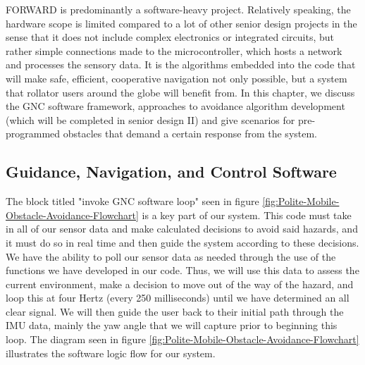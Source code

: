 \noindent FORWARD is predominantly a software-heavy project. Relatively speaking, the hardware scope is limited compared to a lot of other senior design projects in the sense that it does not include complex electronics or integrated circuits, but rather simple connections made to the microcontroller, which hosts a network and processes the sensory data. It is the algorithms embedded into the code that will make safe, efficient, cooperative navigation not only possible, but a system that rollator users around the globe will benefit from. In this chapter, we discuss the GNC software framework, approaches to avoidance algorithm development (which will be completed in senior design II) and give scenarios for pre-programmed obstacles that demand a certain response from the system.

\begin{center}
\end{center}

\subsection{Guidance, Navigation, and Control Software} \label{GNC_Software}
\noindent The block titled "invoke GNC software loop" seen in figure \ref{fig:Polite-Mobile-Obstacle-Avoidance-Flowchart} is a key part of our system. This code must take in all of our sensor data and make calculated decisions to avoid said hazards, and it must do so in real time and then guide the system according to these decisions. We have the ability to poll our sensor data as needed through the use of the functions we have developed in our code. Thus, we will use this data to assess the current environment, make a decision to move out of the way of the hazard, and loop this at four Hertz (every 250 milliseconds) until we have determined an all clear signal. We will then guide the user back to their initial path through the IMU data, mainly the yaw angle that we will capture prior to beginning this loop. The diagram seen in figure \ref{fig:Polite-Mobile-Obstacle-Avoidance-Flowchart} illustrates the software logic flow for our system. \\

